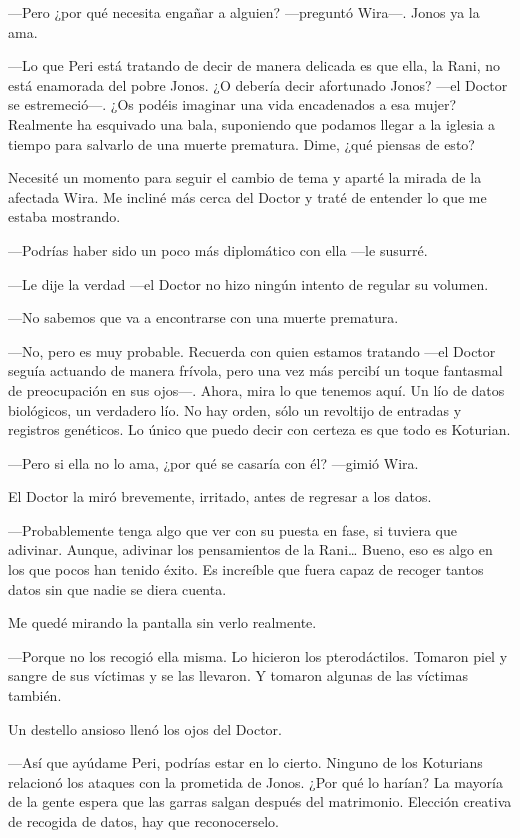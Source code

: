 ---Pero ¿por qué necesita engañar a alguien? ---preguntó Wira---. Jonos
ya la ama.

---Lo que Peri está tratando de decir de manera delicada es que ella, la
Rani, no está enamorada del pobre Jonos. ¿O debería decir afortunado
Jonos? ---el Doctor se estremeció---. ¿Os podéis imaginar una vida
encadenados a esa mujer? Realmente ha esquivado una bala, suponiendo que
podamos llegar a la iglesia a tiempo para salvarlo de una muerte
prematura. Dime, ¿qué piensas de esto?

Necesité un momento para seguir el cambio de tema y aparté la mirada de
la afectada Wira. Me incliné más cerca del Doctor y traté de entender lo
que me estaba mostrando.

---Podrías haber sido un poco más diplomático con ella ---le susurré.

---Le dije la verdad ---el Doctor no hizo ningún intento de regular su
volumen.

---No sabemos que va a encontrarse con una muerte prematura.

---No, pero es muy probable. Recuerda con quien estamos tratando ---el
Doctor seguía actuando de manera frívola, pero una vez más percibí un
toque fantasmal de preocupación en sus ojos---. Ahora, mira lo que
tenemos aquí. Un lío de datos biológicos, un verdadero lío. No hay
orden, sólo un revoltijo de entradas y registros genéticos. Lo único que
puedo decir con certeza es que todo es Koturian.

---Pero si ella no lo ama, ¿por qué se casaría con él? ---gimió Wira.

El Doctor la miró brevemente, irritado, antes de regresar a los datos.

---Probablemente tenga algo que ver con su puesta en fase, si tuviera
que adivinar. Aunque, adivinar los pensamientos de la Rani\ldots{}
Bueno, eso es algo en los que pocos han tenido éxito. Es increíble que
fuera capaz de recoger tantos datos sin que nadie se diera cuenta.

Me quedé mirando la pantalla sin verlo realmente.

---Porque no los recogió ella misma. Lo hicieron los pterodáctilos.
Tomaron piel y sangre de sus víctimas y se las llevaron. Y tomaron
algunas de las víctimas también.

Un destello ansioso llenó los ojos del Doctor.

---Así que ayúdame Peri, podrías estar en lo cierto. Ninguno de los
Koturians relacionó los ataques con la prometida de Jonos. ¿Por qué lo
harían? La mayoría de la gente espera que las garras salgan después del
matrimonio. Elección creativa de recogida de datos, hay que
reconocerselo.

